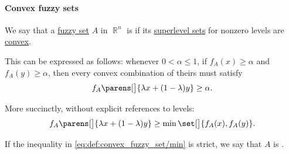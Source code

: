 \paragraph{Convex fuzzy sets}

\begin{definition}\label{def:convex_fuzzy_set}
  We say that a \hyperref[def:fuzzy_set]{fuzzy set} \( A \) in \( \BbbR^n \) is  if its \hyperref[def:level_set]{superlevel sets} for nonzero levels are \hyperref[def:convex_set]{convex}.

  This can be expressed as follows: whenever \( 0 < \alpha \leq 1 \), if \( f_A(x) \geq \alpha \) and \( f_A(y) \geq \alpha \), then every convex combination of theirs must satisfy
  \begin{equation}\label{eq:def:convex_fuzzy_set/superlevel}
    f_A\parens[\big]{ \lambda x + (1 - \lambda) y } \geq \alpha.
  \end{equation}

  More succinctly, without explicit references to levels:
  \begin{equation}\label{eq:def:convex_fuzzy_set/min}
    f_A\parens[\big]{ \lambda x + (1 - \lambda) y } \geq \min\set[\big]{ f_A(x), f_A(y) }.
  \end{equation}

  If the inequality in \eqref{eq:def:convex_fuzzy_set/min} is strict, we say that \( A \) is .
\end{definition}

